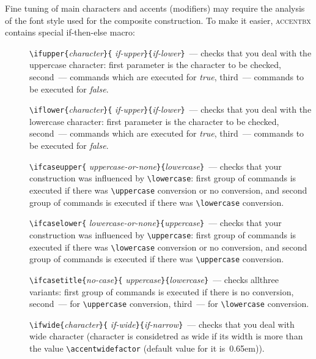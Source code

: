 Fine tuning of main characters and accents (modifiers) may require
the analysis of the font style used for the composite construction.
To make it easier, \textsc{accentbx} contains special
\textsf{if-then-else} macro:
\begin{description}

\item[] \verb?\ifupper{?{\em character}\verb?}{?%
              {\em if-upper}\verb?}{?{\em if-lower}\verb?}?~---
        checks that you deal with the uppercase character:
        first parameter is the character to be checked,
        second~--- commands which are executed for {\em true},
        third~--- commands to be executed for {\em false}.

\item[] \verb?\iflower{?{\em character}\verb?}{?%
              {\em if-upper}\verb?}{?{\em if-lower}\verb?}?~---
        checks that you deal with the lowercase character:
        first parameter is the character to be checked,
        second~--- commands which are executed for {\em true},
        third~--- commands to be executed for {\em false}.

\item[]  \verb?\ifcaseupper{?%
              {\em uppercase-or-none}\verb?}{?{\em lowercase}\verb?}?~---
        checks that your construction was influenced by \verb?\lowercase?:
        first group of commands is executed
        if there was \verb?\uppercase? conversion or no conversion,
        and second group of commands is executed
        if there was \verb?\lowercase? conversion.

\item[] \verb?\ifcaselower{?%
              {\em lowercase-or-none}\verb?}{?{\em uppercase}\verb?}?~---
        checks that your construction was influenced by \verb?\uppercase?:
        first group of commands is executed
        if there was \verb?\lowercase? conversion or no conversion,
        and second group of commands is executed
        if there was \verb?\uppercase? conversion.

\item[] \verb?\ifcasetitle{?{\em no-case}\verb?}{?%
              {\em uppercase}\verb?}{?{\em lowercase}\verb?}?~---
        checks allthree variants:
        first group of commands is executed if there is no conversion,
        second~--- for  \verb?\uppercase? conversion, third~---
        for \verb?\lowercase? conversion.

\item[] \verb?\ifwide{?{\em character}\verb?}{?%
              {\em if-wide}\verb?}{?{\em if-narrow}\verb?}?~---
        checks that you deal with wide character (character
        is considetred as wide if its width
        is more than the value \verb?\accentwidefactor?
        (default value for it is~\textsf{0.65em})).


\end{description}
